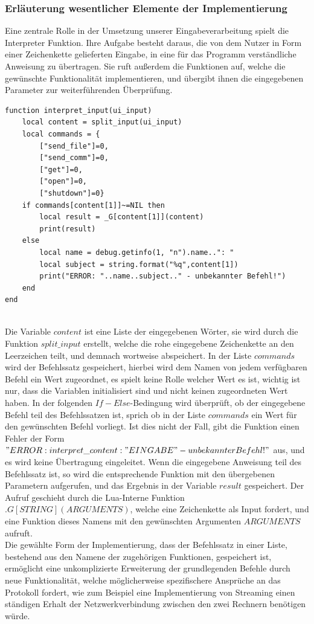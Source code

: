 \documentclass[12pt, a4paper]{scrartcl}
\begin{document}
\subsubsection{Erläuterung wesentlicher Elemente der Implementierung}
Eine zentrale Rolle in der Umsetzung unserer Eingabeverarbeitung spielt die Interpreter Funktion. Ihre Aufgabe besteht daraus, die von dem Nutzer in Form einer Zeichenkette gelieferten Eingabe, in eine für das Programm verständliche Anweisung zu übertragen. Sie ruft außerdem die Funktionen auf, welche die gewünschte Funktionalität implementieren, und übergibt ihnen die eingegebenen Parameter zur weiterführenden Überprüfung.\\
\begin{lstlisting}[caption = {Interpreter Funktion}]
function interpret_input(ui_input)
    local content = split_input(ui_input)
    local commands = {
        ["send_file"]=0,
        ["send_comm"]=0,
        ["get"]=0,
        ["open"]=0,
        ["shutdown"]=0}
    if commands[content[1]]~=NIL then
        local result = _G[content[1]](content)
        print(result)
    else
        local name = debug.getinfo(1, "n").name..": "
        local subject = string.format("%q",content[1])
        print("ERROR: "..name..subject.." - unbekannter Befehl!")
    end
end
\end{lstlisting}\hfill\\
Die Variable $content$ ist eine Liste der eingegebenen Wörter, sie wird durch die Funktion $split\_input$ erstellt, welche die rohe eingegebene Zeichenkette an den Leerzeichen teilt, und demnach wortweise abspeichert. In der Liste $commands$ wird der Befehlssatz gespeichert, hierbei wird dem Namen von jedem verfügbaren Befehl ein Wert zugeordnet, es spielt keine Rolle welcher Wert es ist, wichtig ist nur, dass die Variablen initialisiert sind und nicht keinen zugeordneten Wert haben. In der folgenden $If-Else$-Bedingung wird überprüft, ob der eingegebene Befehl teil des Befehlssatzen ist, sprich ob in der Liste $commands$ ein Wert für den gewünschten Befehl vorliegt. Ist dies nicht der Fall, gibt die Funktion einen Fehler der Form $"ERROR: interpret\_content: "EINGABE" - unbekannter Befehl!"$ aus, und es wird keine Übertragung eingeleitet. Wenn die eingegebene Anweisung teil des Befehlssatz ist, so wird die entsprechende Funktion mit den übergebenen Parametern aufgerufen, und das Ergebnis in der Variable $result$ gespeichert. Der Aufruf geschieht durch die Lua-Interne Funktion $.G[STRING](ARGUMENTS)$, welche eine Zeichenkette als Input fordert, und eine Funktion dieses Namens mit den gewünschten Argumenten $ARGUMENTS$ aufruft.\\ Die gewählte Form der Implementierung, dass der Befehlssatz in einer Liste, bestehend aus den Namene der zugehörigen Funktionen, gespeichert ist, ermöglicht eine unkomplizierte Erweiterung der grundlegenden Befehle durch neue Funktionalität, welche möglicherweise spezifischere Ansprüche an das Protokoll fordert, wie zum Beispiel eine Implementierung von Streaming einen ständigen Erhalt der Netzwerkverbindung zwischen den zwei Rechnern benötigen würde. \\
\end{document}
